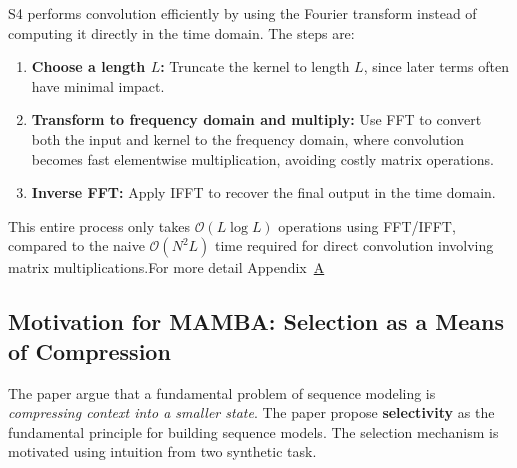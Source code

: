 \documentclass{article}
\theoremstyle{definition}
\begin{document}
S4 performs convolution efficiently by using the Fourier transform instead of computing it directly in the time domain. The steps are:

\begin{enumerate}
 \item \textbf{Choose a length \(L\):}  
Truncate the kernel to length \(L\), since later terms often have minimal impact.

  \item \textbf{Transform to frequency domain and multiply:}  
Use FFT to convert both the input and kernel to the frequency domain, where convolution becomes fast elementwise multiplication, avoiding costly matrix operations.

  \item \textbf{Inverse FFT:}  
Apply IFFT to recover the final output in the time domain.

\end{enumerate}

This entire process only takes \(\mathcal{O}(L \log L)\) operations using FFT/IFFT, compared to the naive \(\mathcal{O}(N^2 L)\) time required for direct convolution involving matrix multiplications.For more detail Appendix~\hyperref[appendix:s4 algorithm]{A}




    

\subsection{Motivation for MAMBA: Selection as a Means of Compression}
The paper argue that a fundamental problem of sequence modeling is \textit{compressing context into a smaller state}. The paper propose \textbf{selectivity} as the fundamental principle for building sequence models. The selection mechanism is motivated using intuition from two synthetic task.
\end{document}
